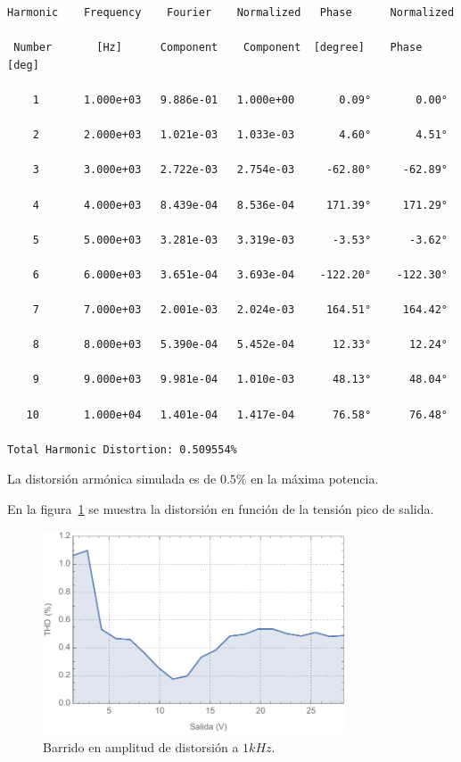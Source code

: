 \documentclass[a4paper,12pt,twoside]{article}
\begin{document}
\begin{verbatim}
Harmonic	Frequency	 Fourier 	Normalized	 Phase  	Normalized

 Number 	  [Hz]   	Component	 Component	[degree]	Phase [deg]

    1   	1.000e+03	9.886e-01	1.000e+00	    0.09°	    0.00°

    2   	2.000e+03	1.021e-03	1.033e-03	    4.60°	    4.51°

    3   	3.000e+03	2.722e-03	2.754e-03	  -62.80°	  -62.89°

    4   	4.000e+03	8.439e-04	8.536e-04	  171.39°	  171.29°

    5   	5.000e+03	3.281e-03	3.319e-03	   -3.53°	   -3.62°

    6   	6.000e+03	3.651e-04	3.693e-04	 -122.20°	 -122.30°

    7   	7.000e+03	2.001e-03	2.024e-03	  164.51°	  164.42°

    8   	8.000e+03	5.390e-04	5.452e-04	   12.33°	   12.24°

    9   	9.000e+03	9.981e-04	1.010e-03	   48.13°	   48.04°

   10   	1.000e+04	1.401e-04	1.417e-04	   76.58°	   76.48°

Total Harmonic Distortion: 0.509554%
\end{verbatim}

La distorsión armónica simulada es de $0.5\%$ en la máxima potencia. %

En la figura~\ref{fig:distorsion-barrido} se muestra la distorsión en función de la tensión pico de salida.

\begin{figure}[H]
	\centering
	\includegraphics[width=0.8\textwidth]{img/sim/distorsion-barrido}
	\caption{Barrido en amplitud de distorsión a $1kHz$.}
	\label{fig:distorsion-barrido}
\end{figure}
\end{document}
